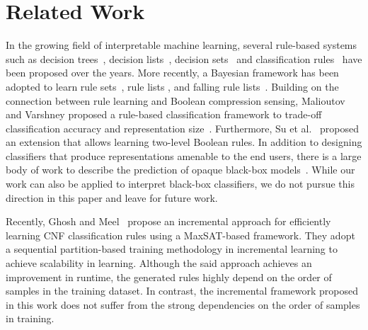 \section{Related Work}
\label{interpretability_crr_sec:related_work}
In the growing field of interpretable machine learning,  several rule-based systems such as decision trees~\cite{narodytska2018learning},  decision lists~\cite{R1987}, decision sets~\cite{ignatiev2018sat,lakkaraju2016interpretable} and classification rules~\cite{C1995,DGW2018} have been proposed over the years. More recently, a Bayesian framework has been adopted to learn rule sets~\cite{WRDLKM2017}, rule lists \cite{LRMM2015},  and falling rule lists~\cite{WR2015}. Building on the connection between rule learning and Boolean compression sensing, Malioutov and Varshney proposed a rule-based classification framework to trade-off classification accuracy and representation size~\cite{MV2013}. Furthermore, Su et al.~\cite{SWVM2015} proposed an extension that allows learning two-level Boolean rules. In addition to designing classifiers that produce representations amenable to the end users, there is a large body of work to describe the prediction of opaque black-box models~\cite{LKCL2019,lundberg2017unified,ribeiro2016should}.  While our work can also be applied to interpret black-box classifiers, we do not pursue this direction in this paper and leave for future work. 

Recently,  Ghosh and Meel~\cite{ghosh19incremental} propose an incremental approach for efficiently learning CNF classification rules using a MaxSAT-based framework. They adopt a sequential partition-based training methodology in incremental learning to achieve scalability in learning. Although the said approach achieves an improvement in runtime,  the generated rules highly depend on the order of samples in the training dataset. In contrast, the incremental framework proposed in this work does not suffer from the strong dependencies on the order of samples in training.

